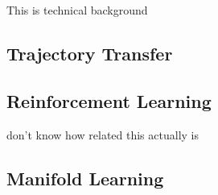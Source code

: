 This is technical background
\subsection{Trajectory Transfer}
\subsection{Reinforcement Learning}
don't know how related this actually is
\subsection{Manifold Learning}
